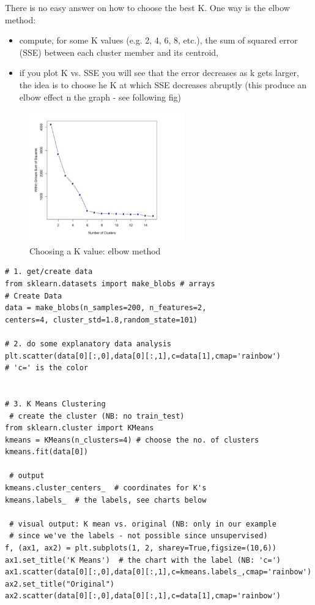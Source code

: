 \documentclass[11pt]{article}
\begin{document}
There is no easy answer on how to choose the best K. One way is the  elbow method:
\begin{itemize}
	\item compute, for some K values (e.g. 2, 4, 6, 8, etc.), the sum of squared error (SSE) between each cluster member and its centroid,
	\item if you plot K vs. SSE you will see that the error decreases as k gets larger, the idea is to choose he K at which SSE decreases abruptly (this produce an elbow effect n the graph - see following fig) 
\end{itemize} 
\begin{figure}[htbp] 
	\centering
	\includegraphics[width=0.6\textwidth]{pics/elbow}
	\caption{Choosing a K value: elbow method} 
\end{figure}

\begin{lstlisting}
# 1. get/create data
from sklearn.datasets import make_blobs # arrays
# Create Data
data = make_blobs(n_samples=200, n_features=2, 
centers=4, cluster_std=1.8,random_state=101)

# 2. do some explanatory data analysis
plt.scatter(data[0][:,0],data[0][:,1],c=data[1],cmap='rainbow')
# 'c=' is the color


# 3. K Means Clustering
 # create the cluster (NB: no train_test) 
from sklearn.cluster import KMeans
kmeans = KMeans(n_clusters=4) # choose the no. of clusters
kmeans.fit(data[0])

 # output
kmeans.cluster_centers_  # coordinates for K's
kmeans.labels_  # the labels, see charts below

 # visual output: K mean vs. original (NB: only in our example 
 # since we've the labels - not possible since unsupervised)
f, (ax1, ax2) = plt.subplots(1, 2, sharey=True,figsize=(10,6))
ax1.set_title('K Means')  # the chart with the label (NB: 'c=')
ax1.scatter(data[0][:,0],data[0][:,1],c=kmeans.labels_,cmap='rainbow')
ax2.set_title("Original")
ax2.scatter(data[0][:,0],data[0][:,1],c=data[1],cmap='rainbow')
\end{lstlisting}
\end{document}
